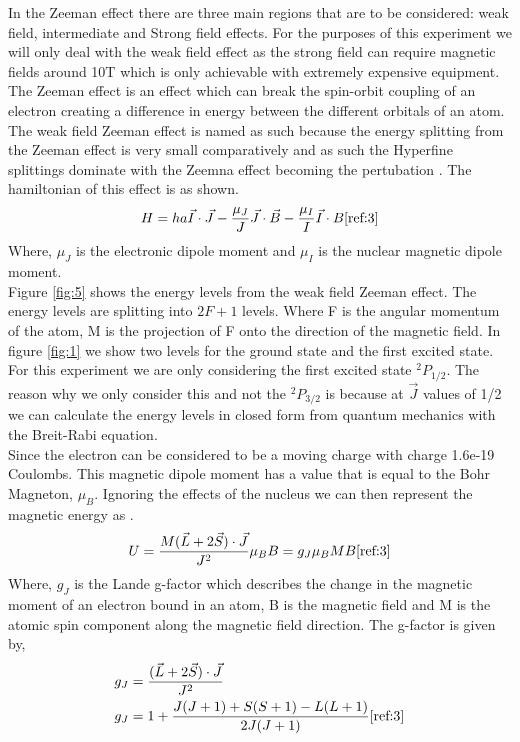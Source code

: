 \documentclass[twocolumn]{article}
\begin{document}
In the Zeeman effect there are three main regions that are to be considered: 
weak field, intermediate and Strong field effects. For the purposes of this 
experiment we will only deal with the weak field effect as the strong field 
can require magnetic fields around 10T which is only achievable with 
extremely expensive equipment.
\\
The Zeeman effect is an effect which can break the spin-orbit coupling of an 
electron creating a difference in energy between the different orbitals of an 
atom. The weak field Zeeman effect is named as such because the energy 
splitting from the Zeeman effect is very small comparatively and as such the 
Hyperfine splittings dominate with the Zeemna effect becoming the pertubation 
\cite{ref:4}. The hamiltonian of this effect is as shown.
\begin{equation}
H=ha\vec{I}\cdot\vec{J}-\frac{\mu_J}{J}\vec{J}\cdot\vec{B}-\frac{\mu_I}{I}\vec{I}\cdot{B}
\label{eqn:6}
\cite{ref:3}
\end{equation}
Where, $\mu_J$ is the electronic dipole moment and $\mu_I$ is the nuclear 
magnetic dipole moment.
\\
Figure \ref{fig:5} shows the energy levels from the weak field Zeeman effect. 
The energy levels are splitting into $2F+1$ levels. Where F is the angular 
momentum of the atom, M is the projection of F onto the direction of the 
magnetic field. In figure \ref{fig:1} we show two levels for the ground state 
and the first excited state. For this experiment we are only considering the 
first excited state $^2P_{1/2}$. The reason why we only consider this and not 
the $^2P_{3/2}$ is because at $\vec{J}$ values of 1/2 we can calculate the 
energy levels in closed form from quantum mechanics with the Breit-Rabi 
equation.
\\
Since the electron can be considered to be a moving charge with charge 1.6e-19 
Coulombs. This magnetic dipole moment has a value that is equal to the Bohr 
Magneton, $\mu_B$. Ignoring the effects of the nucleus we can then represent 
the magnetic energy as \cite{ref:3}.
\begin{equation}
U = \frac{M(\vec{L}+2\vec{S})\cdot\vec{J}}{J^2}\mu_B B = g_J\mu_B M B
\label{eqn:7}
\cite{ref:3}
\end{equation}
Where, $g_J$ is the Lande g-factor which describes the change in the magnetic 
moment of an electron bound in an atom, B is the magnetic field and M is the 
atomic spin component along the magnetic field direction. The g-factor is 
given by,
\begin{equation}
\begin{aligned}
g_J &= \frac{(\vec{L}+2\vec{S})\cdot\vec{J}}{J^2}
\\
g_J &= 1+\frac{J(J+1)+S(S+1)-L(L+1)}{2J(J+1)}
\label{eqn:8}
\cite{ref:3}
\end{aligned}
\end{equation}
\end{document}
